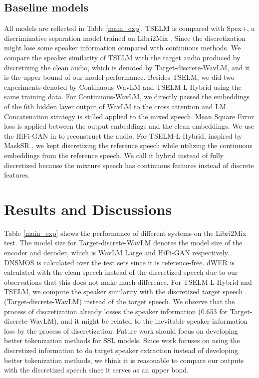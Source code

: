 \documentclass[conference]{IEEEtran}
\begin{document}
\subsection{Baseline models}
All models are reflected in Table \ref{main_exp}. 
TSELM is compared with Spex+, a discriminative separation model \cite{spex_plus} trained on Libri2Mix \cite{librimix}. Since the discretization might lose some 
speaker information compared with continuous methods. We compare the speaker 
similarity of TSELM with the target audio produced by discretizing the clean audio, which is denoted by Target-discrete-WavLM, and it is the upper bound of our model  
performance. Besides TSELM, we did two experiments 
denoted by Continuous-WavLM and TSELM-L-Hybrid using the same training data. 
For Continuous-WavLM, we directly
passed the embeddings of the 6th hidden layer output of WavLM to the cross attention  
and LM. Concatenation strategy is stilled applied to the mixed speech. Mean Square Error loss is applied between the output embeddings and the clean 
embeddings. We use the HiFi-GAN in \cite{knn_vc} to reconstruct the audio. For 
TSELM-L-Hybrid, inspired by MaskSR \cite{mask_sr}, we kept discretizing the reference 
speech while utilizing the continuous embeddings from the reference speech. We call 
it hybrid instead of fully discretized because the mixture speech has continuous 
features instead of discrete features. 

\section{Results and Discussions}
Table \ref{main_exp} shows the performance of different systems on the Libri2Mix test.
The model size for Target-discrete-WavLM denotes the model size of the encoder and 
decoder, which is WavLM Large and HiFi-GAN respectively. DNSMOS is calculated over the 
test sets since it is reference-free. dWER is calculated with the clean speech instead 
of the discretized speech due to our observations that this does not make much difference. 
For TSELM-L-Hybrid and TSELM, we compute the speaker similarity with the discretized
target speech (Target-discrete-WavLM) instead of the target speech.
We observe that the process of discretization already losses the speaker
information (0.653 for Target-discrete-WavLM), and it might be related to the inevitable speaker 
information loss by the process of discretization. Future work should focus on developing better 
tokenization methods for SSL models. 
Since work focuses on using the discretized information 
to do target speaker extraction instead of developing better tokenization methods, we think it is 
reasonable to compare our outputs with the discretized speech since it serves as an upper bond.   
\end{document}
